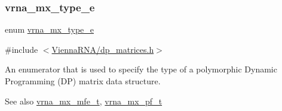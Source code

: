 \subsubsection{\texorpdfstring{vrna\_mx\_type\_e}{vrna\_mx\_type\_e}}
{\footnotesize\ttfamily enum \mbox{\hyperlink{group__dp__matrices_ga6042ea1d58d01931e959791be6d89343}{vrna\+\_\+mx\+\_\+type\+\_\+e}}}



{\ttfamily \#include $<$\mbox{\hyperlink{dp__matrices_8h}{Vienna\+R\+N\+A/dp\+\_\+matrices.\+h}}$>$}



An enumerator that is used to specify the type of a polymorphic Dynamic Programming (DP) matrix data structure. 

\begin{DoxySeeAlso}{See also}
\mbox{\hyperlink{group__dp__matrices_gae5aef35d016475e758f619b7bcb534f9}{vrna\+\_\+mx\+\_\+mfe\+\_\+t}}, \mbox{\hyperlink{group__dp__matrices_ga68729ab3fed26bdd1806fa814f172fc1}{vrna\+\_\+mx\+\_\+pf\+\_\+t}} 
\end{DoxySeeAlso}
